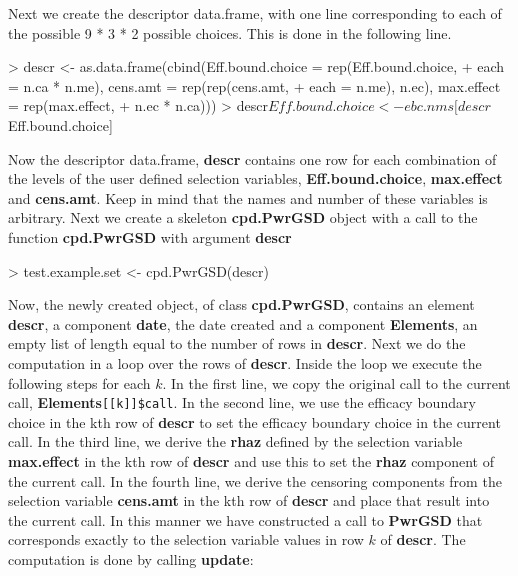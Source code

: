 \documentclass{article}
\begin{document}
Next we create the descriptor data.frame, with one line corresponding to each
of the possible 9 * 3 * 2 possible choices.  This is done in the following line.
\begin{Schunk}
\begin{Sinput}
> descr <- as.data.frame(cbind(Eff.bound.choice = rep(Eff.bound.choice, 
+     each = n.ca * n.me), cens.amt = rep(rep(cens.amt, 
+     each = n.me), n.ec), max.effect = rep(max.effect, 
+     n.ec * n.ca)))
> descr$Eff.bound.choice <- ebc.nms[descr$Eff.bound.choice]
\end{Sinput}
\end{Schunk}

Now the descriptor data.frame, {\bf descr} contains one row for each combination of the
levels of the user defined selection variables, {\bf Eff.bound.choice}, {\bf max.effect}
and  {\bf cens.amt}. Keep in mind that the names and number of these variables is 
arbitrary. Next we create a skeleton {\bf cpd.PwrGSD} object with a call to
the function {\bf cpd.PwrGSD} with argument {\bf descr}

\begin{Schunk}
\begin{Sinput}
> test.example.set <- cpd.PwrGSD(descr)
\end{Sinput}
\end{Schunk}

Now, the newly created object, of class {\bf cpd.PwrGSD}, contains an element
{\bf descr}, a component {\bf date}, the date created and a component
{\bf Elements}, an empty list of length equal to the number of rows in
{\bf descr}.  Next we do the computation in a loop over the rows of
{\bf descr}.  Inside the loop we execute the following steps for each $k$. 
In the first line, we copy the original call to the current call,
{\bf Elements}\verb`[[k]]$call`. In the second line, we use the efficacy boundary
choice in the kth row of {\bf descr} to set the efficacy boundary choice in
the current call. In the third line, we derive the {\bf rhaz} defined by the
selection variable {\bf max.effect} in the kth row of {\bf descr} and use
this to set the {\bf rhaz} component of the current call. In the fourth line,
we derive the censoring components from the selection variable {\bf cens.amt}
in the kth row of {\bf descr} and place that result into the current call.
In this manner we have constructed a call to {\bf PwrGSD} that corresponds
exactly to the selection variable values in row $k$ of {\bf descr}. The
computation is done by calling {\bf update}:
\end{document}
